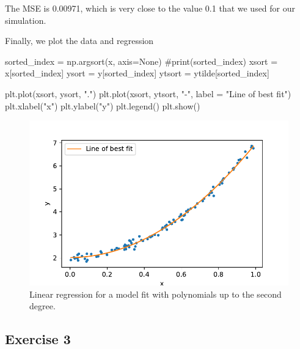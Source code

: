 \documentclass[
  letterpaper,
  DIV=11,
  numbers=noendperiod]{scrartcl}
\newenvironment{Shaded}{\begin{snugshade}}{\end{snugshade}}
\newcommand{\CommentTok}[1]{\textcolor[rgb]{0.37,0.37,0.37}{#1}}
\newcommand{\NormalTok}[1]{\textcolor[rgb]{0.00,0.23,0.31}{#1}}
\newcommand{\OperatorTok}[1]{\textcolor[rgb]{0.37,0.37,0.37}{#1}}
\newcommand{\StringTok}[1]{\textcolor[rgb]{0.13,0.47,0.30}{#1}}
\newcommand{\VariableTok}[1]{\textcolor[rgb]{0.07,0.07,0.07}{#1}}
\begin{document}
The MSE is 0.00971, which is very close to the value 0.1 that we used
for our simulation.

Finally, we plot the data and regression

\begin{Shaded}
\begin{Highlighting}[]
\NormalTok{sorted\_index }\OperatorTok{=}\NormalTok{ np.argsort(x, axis}\OperatorTok{=}\VariableTok{None}\NormalTok{)}
\CommentTok{\#print(sorted\_index)}
\NormalTok{xsort }\OperatorTok{=}\NormalTok{ x[sorted\_index]}
\NormalTok{ysort }\OperatorTok{=}\NormalTok{ y[sorted\_index]}
\NormalTok{ytsort }\OperatorTok{=}\NormalTok{ ytilde[sorted\_index]}

\NormalTok{plt.plot(xsort, ysort, }\StringTok{"."}\NormalTok{)}
\NormalTok{plt.plot(xsort, ytsort, }\StringTok{"{-}"}\NormalTok{, label }\OperatorTok{=} \StringTok{"Line of best fit"}\NormalTok{)}
\NormalTok{plt.xlabel(}\StringTok{"x"}\NormalTok{)}
\NormalTok{plt.ylabel(}\StringTok{"y"}\NormalTok{)}
\NormalTok{plt.legend()}
\NormalTok{plt.show()}
\end{Highlighting}
\end{Shaded}

\begin{figure}[H]

{\centering \includegraphics{w35-exercises_files/figure-pdf/unnamed-chunk-7-1.pdf}

}

\caption{Linear regression for a model fit with polynomials up to the
second degree.}

\end{figure}

\hypertarget{exercise-3}{%
\subsection{Exercise 3}\label{exercise-3}}
\end{document}
